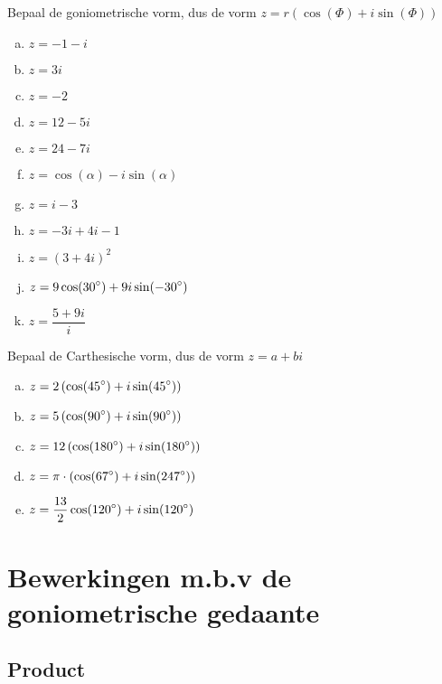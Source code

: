 \documentclass[12pt,twoside,a4paper]{article}
\begin{document}
\begin{oefening}
Bepaal de goniometrische vorm, dus de vorm $z=r(\cos(\Phi)+i\sin(\Phi))$
\begin{multicols}{2}
\begin{enumerate}[(a)]
  \itemsep.5em
  \item $\displaystyle z=-1-i$
  \item $\displaystyle z=3i$
  \item $\displaystyle z=-2$
  \item $\displaystyle z=12-5i$
  \item $\displaystyle z=24-7i$
  \item $\displaystyle z=\cos(\alpha)-i\sin(\alpha)$
  \item $\displaystyle z=i-3$
  \item $\displaystyle z=-3i+4i-1$
  \item $\displaystyle z=\left(3+4i\right)^2$
  \item $\displaystyle z=9\cos(30^\circ)+9i\sin(-30^\circ)$
  \item $\displaystyle z=\dfrac{5+9i}{i}$
\end{enumerate}
\end{multicols}
\end{oefening}

\begin{oefening}
Bepaal de Carthesische vorm, dus de vorm $z=a+bi$
\begin{enumerate}[(a)]
  \itemsep.5em
  \item $\displaystyle z=2\left(\cos(45^\circ)+i\sin(45^\circ)\right)$
  \item $\displaystyle z=5\left(\cos(90^\circ)+i\sin(90^\circ)\right)$
  \item $\displaystyle z=12\left(\cos(180^\circ)+i\sin(180^\circ)\right)$
  \item $\displaystyle z=\pi\cdot\left(\cos(67^\circ)+i\sin(247^\circ)\right)$
  \item $\displaystyle z=\dfrac{13}{2}\cos(120^\circ)+i\sin(120^\circ)$
\end{enumerate}
\end{oefening}

\pagebreak
\section{Bewerkingen m.b.v de goniometrische gedaante}

\subsection{Product}
\end{document}
